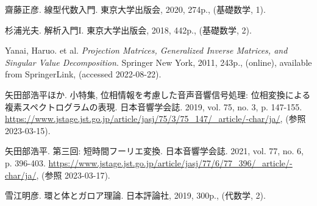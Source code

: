 \documentclass[../../main]{subfiles}
\begin{document}
\begin{thebibliography}{99}
    齋藤正彦. 線型代数入門. 東京大学出版会, 2020, 274p., (基礎数学, 1).

    杉浦光夫. 解析入門I. 東京大学出版会, 2018, 442p., (基礎数学, 2).

    Yanai, Haruo. et al. \textit{Projection Matrices, Generalized Inverse Matrices, and Singular Value Decomposition}. Springer New York, 2011, 243p., (online), available from SpringerLink, (accessed 2022-08-22).

    矢田部浩平ほか. 小特集, 位相情報を考慮した音声音響信号処理: 位相変換による複素スペクトログラムの表現. 日本音響学会誌. 2019, vol. 75, no. 3, p. 147-155. \url{https://www.jstage.jst.go.jp/article/jasj/75/3/75_147/_article/-char/ja/}, (参照 2023-03-15).

    矢田部浩平. 第三回: 短時間フーリエ変換. 日本音響学会誌. 2021, vol. 77, no. 6, p. 396-403. \url{https://www.jstage.jst.go.jp/article/jasj/77/6/77_396/_article/-char/ja/}, (参照 2023-03-17).

    雪江明彦. 環と体とガロア理論. 日本評論社, 2019, 300p., (代数学, 2).
\end{thebibliography}
\end{document}
